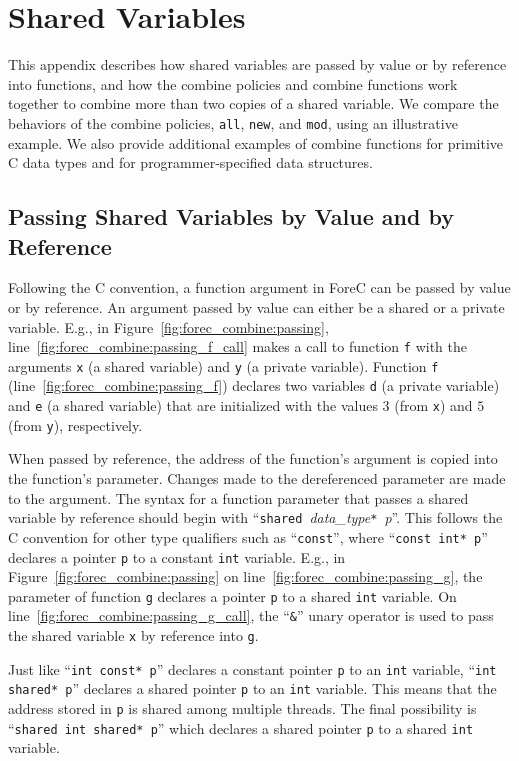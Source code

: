 \section{Shared Variables}
\setcounter{section}{1}
\label{sec:forec_combine}
This appendix describes how shared variables are passed by
value or by reference into functions, and how the combine policies and combine
functions work together to combine more than two copies of a
shared variable. We compare the behaviors of the combine
policies, \verb$all$, \verb$new$, and \verb$mod$, using an
illustrative example. We also provide additional examples of
combine functions for primitive C data types and for
programmer-specified data structures. 

\subsection{Passing Shared Variables by Value and by Reference}
\label{sec:forec_combine:passing}
Following the C convention, a function argument in ForeC can
be passed by value or by reference. An argument passed
by value can either be a shared or a private variable.
E.g., in Figure~\ref{fig:forec_combine:passing}, 
line~\ref{fig:forec_combine:passing_f_call} makes a
call to function \texttt{f} with the arguments \texttt{x} (a
shared variable) and \texttt{y} (a private variable).
Function \texttt{f} (line~\ref{fig:forec_combine:passing_f}) 
declares two variables \texttt{d} (a
private variable) and \texttt{e} (a shared variable) that
are initialized with the values $3$ (from \texttt{x}) and
$5$ (from \texttt{y}), respectively.

When passed by reference, the address
of the function's argument is copied into the function's parameter.
Changes made to the dereferenced parameter are made to
the argument. The syntax for a function parameter
that passes a shared variable by reference should begin with
``\texttt{shared}~\emph{data\_type}\texttt{*}~\emph{p}''. 
This follows the C convention for other type qualifiers such 
as ``\texttt{const}'', where ``\texttt{const~int*~p}''
declares a pointer \texttt{p} to a constant \texttt{int} variable.
E.g., in Figure~\ref{fig:forec_combine:passing} on 
line~\ref{fig:forec_combine:passing_g}, the parameter of
function \texttt{g} declares a pointer \texttt{p} to a shared 
\texttt{int} variable. On line~\ref{fig:forec_combine:passing_g_call}, 
the ``\texttt{\&}'' unary 
operator is used to pass the shared variable \texttt{x} by 
reference into \texttt{g}.

Just like ``\texttt{int~const*~p}'' declares a constant pointer 
\texttt{p} to an \texttt{int} variable, ``\texttt{int shared* p}''
declares a shared pointer \texttt{p} to an \texttt{int} variable. 
This means that the address stored in \texttt{p} is shared among 
multiple threads. The final possibility is ``\texttt{shared~int~shared*~p}'' 
which declares a shared pointer \texttt{p} to a shared \texttt{int} 
variable.

